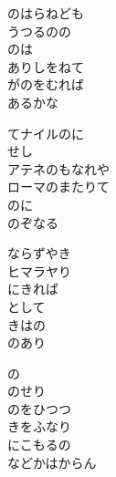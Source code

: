 \documentclass[10pt,b5j]{tarticle} %
\begin{document}
\vspace{1.5em} %
\newcommand{\linespace}{0.5em} %
\newcommand{\blocksize}{0.5\hsize} %
\begin{enumerate} %
    \begin{minipage}[c]{\blocksize}
    
        \vspace{\linespace}
        \item
        のはらねども\\
        うつるのの\\
        のは\\
        ありしをねて\\
        がのをむれば\\
        あるかな
        
        \vspace{\linespace}
        \item
        てナイルのに\\
        せし\\
        アテネのもなれや\\
        ローマのまたりて\\
        のに\\
        のぞなる
        
        \vspace{\linespace}
        \item
        ならずやき\\
        ヒマラヤり\\
        にきれば\\
        として\\
        きはの\\
        のあり
        
        \vspace{\linespace}
        \item
        の\\
        のせり\\
        のをひつつ\\
        きをふなり\\
        にこもるの\\
        などかはからん
        

\end{minipage}
\end{enumerate}
\end{document}
